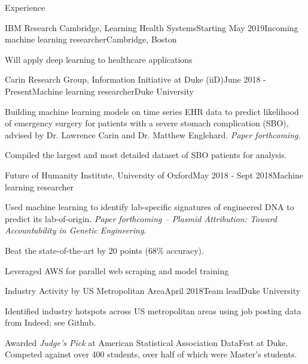 \documentclass{resume} %
\begin{document}
\begin{rSection}{Experience}

\begin{rSubsection}{IBM Research Cambridge, Learning Health Systems}{Starting May 2019}{Incoming machine learning researcher}{Cambridge, Boston}
	\item Will apply deep learning to healthcare applications
\end{rSubsection}

\begin{rSubsection}{Carin Research Group, Information Initiative at Duke (iiD)}{June 2018 - Present}{Machine learning researcher}{Duke University}
\item Building machine learning models on time series EHR data to predict likelihood of emergency surgery for patients with a severe stomach complication (SBO), advised by Dr. Lawrence Carin and Dr. Matthew Englehard. \textit{Paper forthcoming}.
\item Compiled the largest and most detailed dataset of SBO patients for analysis.

\end{rSubsection}

\begin{rSubsection}{Future of Humanity Institute, University of Oxford}{May 2018 - Sept 2018}{Machine learning researcher}{}
\item Used machine learning to identify lab-specific signatures of engineered DNA to predict its lab-of-origin. \textit{Paper forthcoming -- Plasmid Attribution: Toward Accountability in Genetic Engineering}.
\item Beat the state-of-the-art by 20 points (68\% accuracy).
\item Leveraged AWS for parallel web scraping and model training
\end{rSubsection}


\begin{rSubsection}{Industry Activity by US Metropolitan Area}{April 2018}{Team lead}{Duke University}
\item Identified industry hotspots across US metropolitan areas using job posting data from Indeed; see Github.
\item Awarded \textit{Judge's Pick} at American Statistical Association DataFest at Duke. Competed against over 400 students, over half of which were Master's students.
\end{rSubsection}


\end{rSection}
\end{document}
